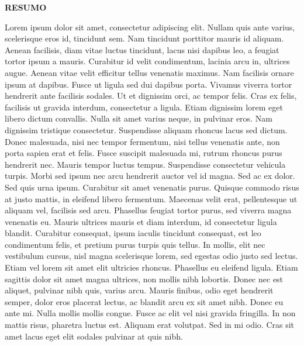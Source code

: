 \begin{newpage}
	\thispagestyle{empty}
	\begin{center}
		\textbf{RESUMO} \\ [1.5\baselineskip]
	\end{center}
	\singlespace %
	\noindent %
	\setlength{\baselineskip}{1.5\baselineskip} %
	
	

	Lorem ipsum dolor sit amet, consectetur adipiscing elit. Nullam quis ante varius, scelerisque eros id, tincidunt sem. Nam tincidunt porttitor mauris id aliquam. Aenean facilisis, diam vitae luctus tincidunt, lacus nisi dapibus leo, a feugiat tortor ipsum a mauris. Curabitur id velit condimentum, lacinia arcu in, ultrices augue. Aenean vitae velit efficitur tellus venenatis maximus. Nam facilisis ornare ipsum at dapibus. Fusce ut ligula sed dui dapibus porta. Vivamus viverra tortor hendrerit ante facilisis sodales. Ut et dignissim orci, ac tempor felis. Cras ex felis, facilisis ut gravida interdum, consectetur a ligula.
	Etiam dignissim lorem eget libero dictum convallis. Nulla sit amet varius neque, in pulvinar eros. Nam dignissim tristique consectetur. Suspendisse aliquam rhoncus lacus sed dictum. Donec malesuada, nisi nec tempor fermentum, nisi tellus venenatis ante, non porta sapien erat et felis. Fusce suscipit malesuada mi, rutrum rhoncus purus hendrerit nec. Mauris tempor luctus tempus. Suspendisse consectetur vehicula turpis. Morbi sed ipsum nec arcu hendrerit auctor vel id magna. Sed ac ex dolor. Sed quis urna ipsum. Curabitur sit amet venenatis purus. Quisque commodo risus at justo mattis, in eleifend libero fermentum. Maecenas velit erat, pellentesque ut aliquam vel, facilisis sed arcu. Phasellus feugiat tortor purus, sed viverra magna venenatis eu. Mauris ultrices mauris et diam interdum, id consectetur ligula blandit.
	Curabitur consequat, ipsum iaculis tincidunt consequat, est leo condimentum felis, et pretium purus turpis quis tellus. In mollis, elit nec vestibulum cursus, nisl magna scelerisque lorem, sed egestas odio justo sed lectus. Etiam vel lorem sit amet elit ultricies rhoncus. Phasellus eu eleifend ligula. Etiam sagittis dolor sit amet magna ultrices, non mollis nibh lobortis. Donec nec est aliquet, pulvinar nibh quis, varius arcu. Mauris finibus, odio eget hendrerit semper, dolor eros placerat lectus, ac blandit arcu ex sit amet nibh. Donec eu ante mi. Nulla mollis mollis congue. Fusce ac elit vel nisi gravida fringilla. In non mattis risus, pharetra luctus est. Aliquam erat volutpat. Sed in mi odio. Cras sit amet lacus eget elit sodales pulvinar at quis nibh.

\end{newpage}
